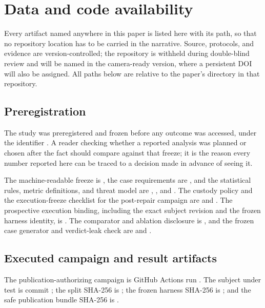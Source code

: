 \section{Data and code availability}
\label{sec:availability}

Every artifact named anywhere in this paper is listed here with its path, so that no repository location has to be carried in the narrative. Source, protocols, and evidence are version-controlled; the repository is withheld during double-blind review and will be named in the camera-ready version, where a persistent DOI will also be assigned. All paths below are relative to the paper's directory in that repository.

\subsection{Preregistration}
The study was preregistered and frozen before any outcome was accessed, under the identifier . A reader checking whether a reported analysis was planned or chosen after the fact should compare against that freeze; it is the reason every number reported here can be traced to a decision made in advance of seeing it.

The machine-readable freeze is , the case requirements are , and the statistical rules, metric definitions, and threat model are , , and . The custody policy and the execution-freeze checklist for the post-repair campaign are  and . The prospective execution binding, including the exact subject revision and the frozen harness identity, is . The comparator and ablation disclosure is , and the frozen case generator and verdict-leak check are  and .

\subsection{Executed campaign and result artifacts}
The publication-authorizing campaign is GitHub Actions run . The subject under test is commit ; the split SHA-256 is
; the frozen harness SHA-256 is
; and the safe publication bundle SHA-256 is
.

